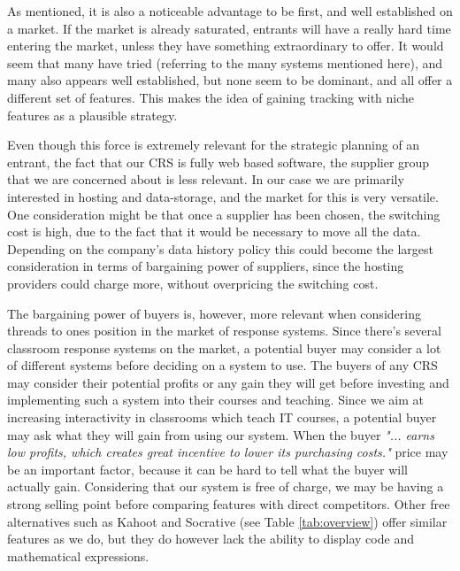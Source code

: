 As mentioned, it is also a noticeable advantage to be first, and well established on a market. If the market is already saturated, entrants will have a really hard time entering the market, unless they have something extraordinary to offer. It would seem that many have tried (referring to the many systems mentioned here), and many also appears well established, but none seem to be dominant, and all offer a different set of features. This makes the idea of gaining tracking with niche features as a plausible strategy.

Even though this force is extremely relevant for the strategic planning of an entrant, the fact that our CRS is fully web based software, the supplier group that we are concerned about is less relevant. In our case we are primarily interested in hosting and data-storage, and the market for this is very versatile. One consideration might be that once a supplier has been chosen, the switching cost is high, due to the fact that it would be necessary to move all the data. Depending on the company's data history policy this could become the largest consideration in terms of bargaining power of suppliers, since the hosting providers could charge more, without overpricing the switching cost.


The bargaining power of buyers is, however, more relevant when considering threads to ones position in the market of response systems. Since there's several classroom response systems on the market, a potential buyer may consider a lot of different systems before deciding on a system to use. The buyers of any CRS may consider their potential profits or any gain they will get before investing and implementing such a system into their courses and teaching. Since we aim at increasing interactivity in classrooms which teach IT courses, a potential buyer may ask what they will gain from using our system. When the buyer \emph{"... earns low profits, which creates great incentive to lower its purchasing costs."} \cite[p.~141]{porter1979competitive} price may be an important factor, because it can be hard to tell what the buyer will actually gain. Considering that our system is free of charge, we may be having a strong selling point before comparing features with direct competitors. Other free alternatives such as Kahoot and Socrative (see Table \ref{tab:overview}) offer similar features as we do, but they do however lack the ability to display code and mathematical expressions.


